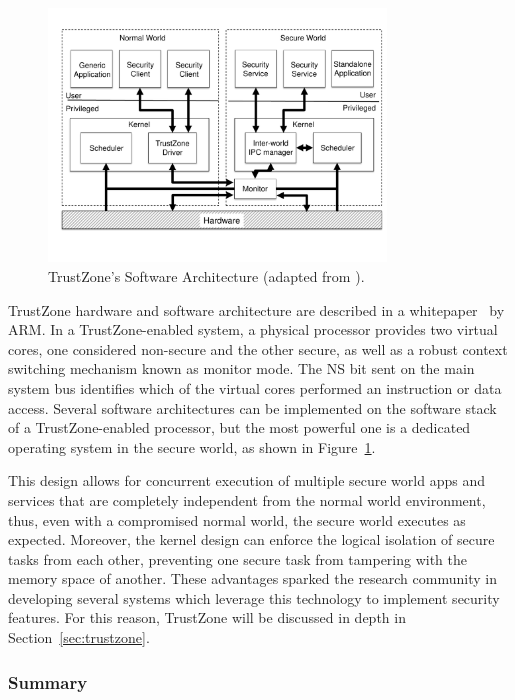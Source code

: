 \begin{figure}[t!]
	\centering
	\includegraphics[width=0.80\textwidth]{img/trustzone.pdf}
	\caption{TrustZone's Software Architecture (adapted from \cite{trustzone_whitepaper}).}
	\label{fig:trustzone_architecture}
\end{figure}

TrustZone hardware and software architecture are described in a whitepaper~\cite{trustzone_whitepaper} by ARM. In a TrustZone-enabled system, a physical processor provides two virtual cores, one considered non-secure and the other secure, as well as a robust context switching mechanism known as monitor mode. The NS bit sent on the main system bus identifies which of the virtual cores performed an instruction or data access. Several software architectures can be implemented on the software stack of a TrustZone-enabled processor, but the most powerful one is a dedicated operating system in the secure world, as shown in Figure~\ref{fig:trustzone_architecture}.

This design allows for concurrent execution of multiple secure world apps and services that are completely independent from the normal world environment, thus, even with a compromised normal world, the secure world executes as expected. Moreover, the kernel design can enforce the logical isolation of secure tasks from each other, preventing one secure task from tampering with the memory space of another. These advantages sparked the research community in developing several systems which leverage this technology to implement security features. For this reason, TrustZone will be discussed in depth in Section~\ref{sec:trustzone}.

\subsubsection{Summary}

